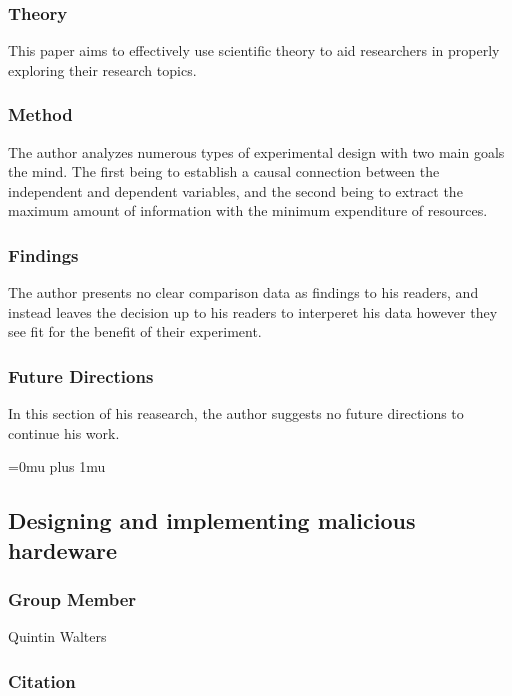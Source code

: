 \subsubsection{Theory}

\noindent
This paper aims to effectively use scientific theory to aid researchers in properly exploring their research topics.

\subsubsection{Method}

\noindent
The author analyzes numerous types of experimental design with two main goals the mind. The first being to establish a causal connection between the independent and dependent variables, and the second being to extract the maximum amount of information with the minimum expenditure of resources.

\subsubsection{Findings}

\noindent
The author presents no clear comparison data as findings to his readers, and instead leaves the decision up to his readers to interperet his data however they see fit for the benefit of their experiment.

\subsubsection{Future Directions}

\noindent
In this section of his reasearch, the author suggests no future directions to continue his work.

\Urlmuskip=0mu plus 1mu\relax

\noindent
\subsection{Designing and implementing malicious hardeware}

\subsubsection{Group Member}

\noindent
Quintin Walters

\noindent
\subsubsection{Citation}

